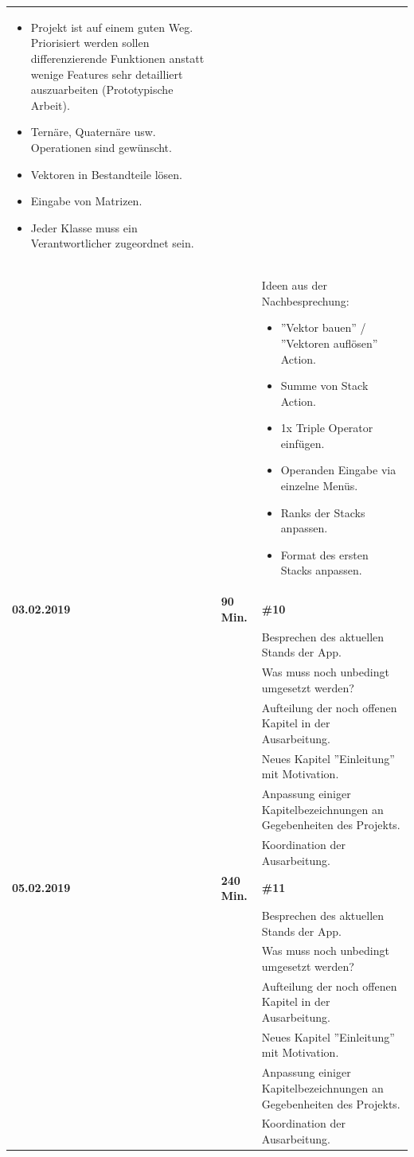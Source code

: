 {\begin{longtable}{|l|l|p{11cm}|}
\begin{itemize}
				\item Projekt ist auf einem guten Weg. Priorisiert werden sollen differenzierende Funktionen anstatt wenige Features sehr detailliert auszuarbeiten (Prototypische Arbeit).
				\item Ternäre, Quaternäre usw. Operationen sind gewünscht.
				\item Vektoren in Bestandteile lösen.
				\item Eingabe von Matrizen.
				\item Jeder Klasse muss ein Verantwortlicher zugeordnet sein.
			\end{itemize}
			\\ & &
			Ideen aus der Nachbesprechung:

			\begin{itemize}\renewcommand\labelitemi{--}
				\item ''Vektor bauen'' / ''Vektoren auflösen'' Action. 
				\item Summe von Stack Action.
				\item 1x Triple Operator einfügen.
				\item Operanden Eingabe via einzelne Menüs.
				\item Ranks der Stacks anpassen.
				\item Format des ersten Stacks anpassen.
			\end{itemize}
	\\ \hline
		\textbf{03.02.2019} & \textbf{90 Min.} &
			\textbf{\#10}
			\\ & &
			Besprechen des aktuellen Stands der App.
			\\ & &
			Was muss noch unbedingt umgesetzt werden?
			\\ & &
			Aufteilung der noch offenen Kapitel in der Ausarbeitung.
			\\ & &
			Neues Kapitel ''Einleitung'' mit Motivation.
			\\ & &
			Anpassung einiger Kapitelbezeichnungen an Gegebenheiten des Projekts.
			\\ & &
			Koordination der Ausarbeitung.
	\\ \hline
		\textbf{05.02.2019} & \textbf{240 Min.} &
			\textbf{\#11}
			\\ & &
			Besprechen des aktuellen Stands der App.
			\\ & &
			Was muss noch unbedingt umgesetzt werden?
			\\ & &
			Aufteilung der noch offenen Kapitel in der Ausarbeitung.
			\\ & &
			Neues Kapitel ''Einleitung'' mit Motivation.
			\\ & &
			Anpassung einiger Kapitelbezeichnungen an Gegebenheiten des Projekts.
			\\ & &
			Koordination der Ausarbeitung.
	\\
\end{longtable}
}

